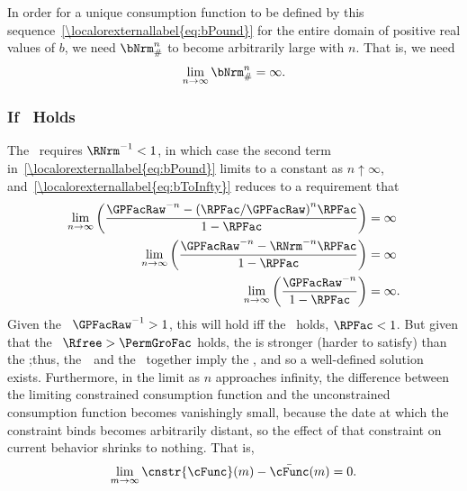 \documentclass[\econtexRoot/BufferStockTheory]{subfiles}
\begin{document}
In order for a unique consumption function to be defined by this sequence~\eqref{\localorexternallabel{eq:bPound}} for the entire domain of positive real values of $b$, we need $\bNrm_{\#}^{n}$ to become arbitrarily large with $n$.  That is, we need
\begin{equation}\begin{gathered}\begin{aligned}
  \lim_{n \rightarrow \infty} \bNrm_{\#}^{n} = \infty. \label{eq:bToInfty}
\end{aligned}\end{gathered}\end{equation}

\subsubsection{If \FHWC~Holds}
The \FHWC~requires $\RNrm^{-1} < 1$, in which case the second term in~\eqref{\localorexternallabel{eq:bPound}} limits to a constant as $n \uparrow \infty$, and~\eqref{\localorexternallabel{eq:bToInfty}} reduces to a requirement that
\begin{eqnarray*}
  \lim_{n \rightarrow \infty} \left(\frac{\GPFacRaw^{-n}-{(\RPFac/\GPFacRaw)}^{n}\RPFac}{1-\RPFac}\right)  & = \infty
  \\  \lim_{n \rightarrow \infty} \left(\frac{\GPFacRaw^{-n}-\RNrm^{-n}\RPFac}{1-\RPFac}\right)  & = \infty
  \\  \lim_{n \rightarrow \infty} \left(\frac{\GPFacRaw^{-n}}{1-\RPFac}\right)  & = \infty.
\end{eqnarray*}
Given the \GICRaw~$\GPFacRaw^{-1}>1$, this will hold iff the \RIC~holds, $\RPFac < 1$.  But given that the \FHWC~$\Rfree > \PermGroFac$ holds, the {\GICRaw} is stronger (harder to satisfy) than the \RIC;\@ thus, the~\FHWC~and the \GICRaw~together imply the \RIC, and so a well-defined solution exists.  Furthermore, in the limit as $n$ approaches infinity, the difference between the limiting constrained consumption function and the unconstrained consumption function becomes vanishingly small, because the date at which the constraint binds becomes arbitrarily distant, so the effect of that constraint on current behavior shrinks to nothing.  That is,
\begin{equation}\begin{gathered}\begin{aligned}
  \lim_{m \rightarrow \infty}\cnstr{\cFunc}(m) - \bar{\cFunc}(m) = 0.
\end{aligned}\end{gathered}\end{equation}
\end{document}
